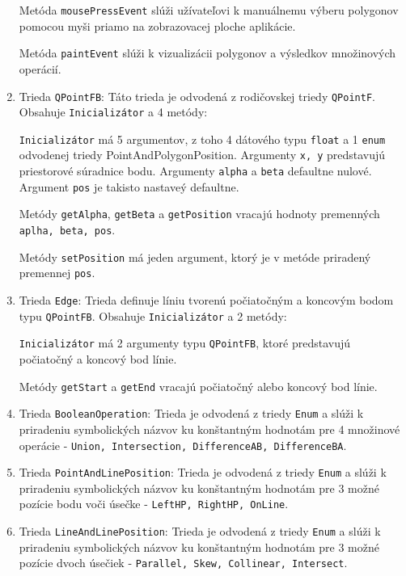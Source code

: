 \documentclass[11pt]{article}
\begin{document}
\begin{enumerate}
    Metóda \texttt{mousePressEvent} slúži užívateľovi k manuálnemu výberu polygonov pomocou myši priamo na zobrazovacej ploche aplikácie.
    
    Metóda \texttt{paintEvent} slúži k vizualizácii polygonov a výsledkov množinových operácií.
    
    \item Trieda \texttt{QPointFB}:
    Táto trieda je odvodená z rodičovskej triedy \texttt{QPointF}. Obsahuje \texttt{Inicializátor} a 4 metódy:
    
    \texttt{Inicializátor} má 5 argumentov, z toho 4 dátového typu \texttt{float} a 1 \texttt{enum} odvodenej triedy PointAndPolygonPosition. Argumenty \texttt{x, y} predstavujú priestorové súradnice bodu. Argumenty \texttt{alpha} a \texttt{beta} defaultne nulové. Argument \texttt{pos} je takisto nastaveý defaultne.    
    
    Metódy \texttt{getAlpha}, \texttt{getBeta} a \texttt{getPosition} vracajú hodnoty premenných \texttt{aplha, beta, pos}. 
    
    Metódy \texttt{setPosition} má jeden argument, ktorý je v metóde priradený premennej \texttt{pos}.  
    
    \item Trieda \texttt{Edge}:
    Trieda definuje líniu tvorenú počiatočným a koncovým bodom typu \texttt{QPointFB}. Obsahuje \texttt{Inicializátor} a 2 metódy: 
    
    \texttt{Inicializátor} má 2 argumenty typu \texttt{QPointFB}, ktoré predstavujú počiatočný a koncový bod línie. 
    
    Metódy \texttt{getStart} a \texttt{getEnd} vracajú počiatočný alebo koncový bod línie.


    \item Trieda \texttt{BooleanOperation}:
    Trieda je odvodená z triedy \texttt{Enum} a slúži k priradeniu symbolických názvov ku konštantným hodnotám pre 4 množinové operácie - \texttt{Union, Intersection, DifferenceAB, DifferenceBA}. 
    
    
    \item Trieda \texttt{PointAndLinePosition}:
    Trieda je odvodená z triedy \texttt{Enum} a slúži k priradeniu symbolických názvov ku konštantným hodnotám pre 3 možné pozície bodu voči úsečke - \texttt{LeftHP, RightHP, OnLine}.
    
    
    \item Trieda \texttt{LineAndLinePosition}:
    Trieda je odvodená z triedy \texttt{Enum} a slúži k priradeniu symbolických názvov ku konštantným hodnotám pre 3 možné pozície dvoch úsečiek - \texttt{Parallel, Skew, Collinear, Intersect}.
    

\end{enumerate}
\end{document}
